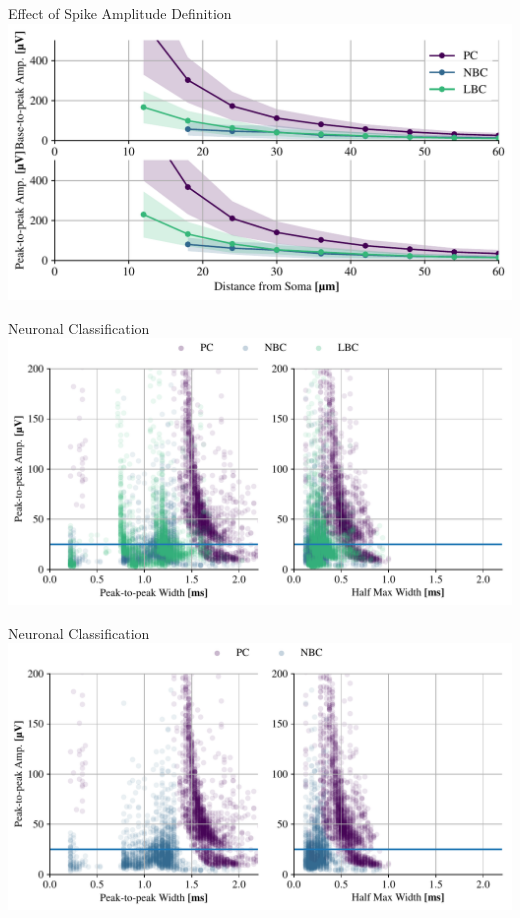 \documentclass{beamer}
\begin{document}
\begin{frame}{Effect of Spike Amplitude Definition}
    \centering
    \includegraphics[width=\textwidth]{images/TTPC2_NBC_LBC_amps.pdf}
\end{frame}

\begin{frame}{Neuronal Classification}
    \includegraphics[width=\textwidth]{images/TTPC2_NBC_LBC_IN_combined_scatter.pdf}
\end{frame}

\begin{frame}{Neuronal Classification}
    \includegraphics[width=\textwidth]{images/TTPC2_NBC_scatter.pdf}
\end{frame}
\end{document}
